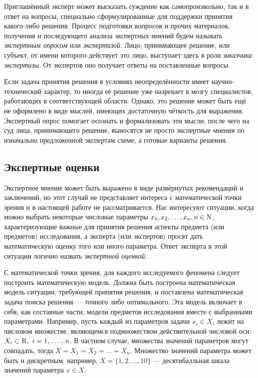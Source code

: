 Приглашённый эксперт может высказать суждение как самопроизвольно, так и в ответ на вопросы, специально сформулированные для поддержки принятия какого-либо решения. Процесс подготовки вопросов и прочих материалов, получения и последующего анализа экспертных мнений будем называть {\sl экспертным опросом} или {\sl экспертизой}. Лицо, принимающее решение, или субъект, от имени которого действует это лицо, выступает здесь в роли {\sl заказчика экспертизы}. От экспертов оно получает ответы на поставленные вопросы.
 
Если задача принятия решения в условиях неопределённости имеет научно-технический характер, то иногда её решение уже назревает в мозгу специалистов, работающих в соответствующей области. Однако, это решение может быть ещё не оформлено в виде мыслей, имеющих достаточную чёткость для выражения. Экспертный опрос помогает осознать и формализовать эти мысли, после чего на суд лица, принимающего решение, выносятся не просто экспертные мнения по изначально предложенной экспертам схеме, а готовые варианты решения. 

\subsection{Экспертные оценки}

Экспертное мнение может быть выражено в виде развёрнутых рекомендаций и заключений, но этот случай не представляет интереса с математической точки зрения и в настоящей работе не рассматривается. Нас интересуют ситуации, когда можно выбрать некоторые числовые параметры $x_1, x_2, \ldots, x_n, n \in {\mathrm{N}}$, характеризующие важные для принятия решения аспекты предмета (или предметов) исследования, а эксперта (или экспертов) просят дать математическую оценку того или иного параметра. Ответ эксперта в этой ситуации логично назвать {\sl экспертной оценкой}. 

С математической точки зрения, для каждого исследуемого феномена следует построить математическую модель. Должна быть построена математическая модель ситуации, требующей принятия решения, и поставлена математическая задача поиска решения --- точного либо оптимального. Эта модель включает в себя, как составные части, модели предметов исследования вместе с выбранными параметрами. Например, пусть каждый из параметров задачи $x_i \in X_i$ лежит на числовом множестве, являющемся подмножеством действительной числовой оси: $X_i \subset {\mathrm{R}},\ i=1,\, \ldots,\, n$. В частном случае, множества значений параметров могут совпадать, тогда $X = X_1 = X_2 = \ldots = X_n$. Множество значений параметра может быть и дискретным, например, $X = \{1, 2, ..., 10\}$ --- десятибалльная шкала значений параметра $x \in X$.

